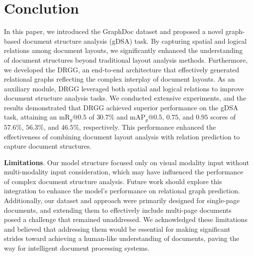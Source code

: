 \vspace{-12px}
\section{Conclution}
In this paper, we introduced the GraphDoc dataset and proposed a novel graph-based document structure analysis (gDSA) task. By capturing spatial and logical relations among document layouts, we significantly enhanced the understanding of document structures beyond traditional layout analysis methods. Furthermore, we developed the DRGG, an end-to-end architecture that effectively generated relational graphs reflecting the complex interplay of document layouts. As an auxiliary module, DRGG leveraged both spatial and logical relations to improve document structure analysis tasks. We conducted extensive experiments, and the results demonstrated that DRGG achieved superior performance on the gDSA task, attaining an mR$_g$@$0.5$ of $30.7\%$ and mAP$_g$@$0.5$, $0.75$, and $0.95$ scores of $57.6\%$, $56.3\%$, and $46.5\%$, respectively. This performance enhanced the effectiveness of combining document layout analysis with relation prediction to capture document structures.

\noindent \textbf{Limitations}. Our model structure focused only on visual modality input without multi-modality input consideration, which may have influenced the performance of complex document structure analysis. Future work should explore this integration to enhance the model's performance on relational graph prediction. Additionally, our dataset and approach were primarily designed for single-page documents, and extending them to effectively include multi-page documents posed a challenge that remained unaddressed. We acknowledged these limitations and believed that addressing them would be essential for making significant strides toward achieving a human-like understanding of documents, paving the way for intelligent document processing systems.